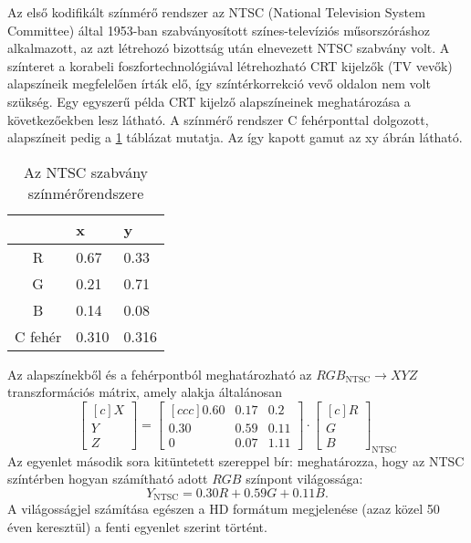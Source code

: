Az első kodifikált színmérő rendszer az NTSC (National Television System Committee) által 1953-ban szabványosított színes-televíziós műsorszóráshoz alkalmazott, az azt létrehozó bizottság után elnevezett NTSC szabvány volt.
A színteret a korabeli foszfortechnológiával létrehozható CRT kijelzők (TV vevők) alapszíneik megfelelően írták elő, így színtérkorrekció vevő oldalon nem volt szükség.
Egy egyszerű példa CRT kijelző alapszíneinek meghatározása a következőekben lesz látható.
A színmérő rendszer C fehérponttal dolgozott, alapszíneit pedig a \ref{tab:ntsc_colorimetry} táblázat mutatja.
Az így kapott gamut az xy ábrán látható.
\begin{table}[h!]
\caption{Az NTSC szabvány színmérőrendszere}
\renewcommand*{\arraystretch}{1}
\label{tab:ntsc_colorimetry}
\begin{center}
\small\addtolength{\tabcolsep}{15pt}
    \begin{tabular}[h!]{ @{}c | | l | l @{} }%
		&   x  	&    y \\ \hline
    R   &  0.67 &	0.33 \\
    G   &  0.21 &   0.71  \\
    B   & 0.14   &	0.08\\
    C fehér     &  0.310 &	0.316  \\
    \end{tabular}
\end{center}
\end{table}
Az alapszínekből és a fehérpontból meghatározható az $RGB_{\mathrm{NTSC}} \rightarrow XYZ$ transzformációs mátrix, amely alakja általánosan
\begin{equation}
\begin{bmatrix}[c]
       X \\[0.3em]
       Y \\[0.3em]
       Z \end{bmatrix}
       = 
  \begin{bmatrix}[c c c]
   0.60 & 0.17 & 0.2  \\
   0.30 & 0.59 & 0.11 \\
   0 & 0.07 & 1.11
\end{bmatrix}
\cdot
\begin{bmatrix}[c]
       R \\[0.3em]
       G \\[0.3em]
       B \end{bmatrix}_{\mathrm{NTSC}}
\label{Eq:NTSC_transform}
\end{equation}
Az egyenlet második sora kitüntetett szereppel bír: meghatározza, hogy az NTSC színtérben hogyan számítható adott $RGB$ színpont világossága:
\begin{equation}Y_{\mathrm{NTSC}} = 
   0.30R + 0.59G + 0.11 B. 
\label{Eq:NTSC_luminance}
\end{equation}
A világosságjel számítása egészen a HD formátum megjelenése (azaz közel 50 éven keresztül) a fenti egyenlet szerint történt.

